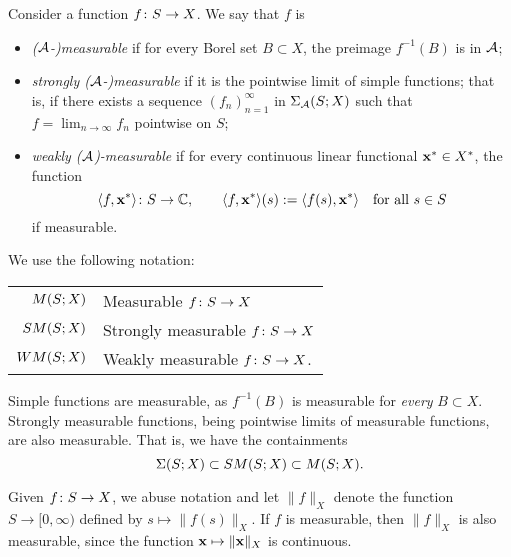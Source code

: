 \begin{defn}
  Consider a function $f \colon S \rightarrow X$.
  We say that $f$ is
  \begin{itemize}
  \item
    \emph{($\mathcal{A}$-)measurable} if for every Borel set $B \subset X$, the preimage $f^{-1}(B)$ is in $\mathcal{A}$;
  \item
    \emph{strongly ($\mathcal{A}$-)measurable} if it is the pointwise limit of simple functions; that is, if there exists a sequence $(f_n)_{n=1}^\infty$ in $\Sigma_{\mathcal{A}}(S;X)$ such that $f = \lim_{n \to \infty} f_n$ pointwise on $S$;
  \item
    \emph{weakly ($\mathcal{A}$)-measurable} if for every continuous linear functional $\mathbf{x}^* \in X^*$, the function
    \begin{equation*}
      \langle f, \mathbf{x}^* \rangle \colon S \rightarrow \mathbb{C}, \qquad \langle f, \mathbf{x}^* \rangle(s) := \langle f(s), \mathbf{x}^* \rangle \quad \text{for all $s \in S$}
    \end{equation*}
    if measurable.
  \end{itemize}

  We use the following notation:
  \begin{center}
    \begin{tabular}{r|l}
      $M (S;X)$  & Measurable $f \colon S \rightarrow X$    \\
      $SM(S;X)$  & Strongly measurable $f \colon S \rightarrow X$    \\
      $WM(S;X)$  & Weakly measurable $f \colon S \rightarrow X$.    
    \end{tabular}
  \end{center}
  
\end{defn}


Simple functions are measurable, as $f^{-1}(B)$ is measurable for \emph{every} $B \subset X$.
Strongly measurable functions, being pointwise limits of measurable functions, are also measurable.
That is, we have the containments
\begin{equation*}
  \Sigma(S;X) \subset SM(S;X) \subset M(S;X).
\end{equation*}


Given $f \colon S \rightarrow X$, we abuse notation and let $\|f\|_X$ denote the function $S \to [0,\infty)$ defined by $s \mapsto \|f(s)\|_X$.
If $f$ is measurable, then $\|f\|_X$ is also measurable, since the function $\mathbf{x} \mapsto \|\mathbf{x}\|_X$ is continuous.

